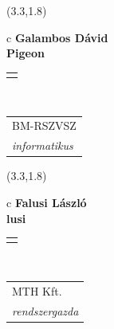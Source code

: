 \documentclass[11pt]{article}
\begin{document}
\makebox(3.3,1.8){
  \renewcommand\arraystretch{1.3}
  \begin{tabular}[c]{c}
    \hspace{8.5mm}
    \LARGE\bf{ Galambos Dávid }\\
    \hspace{8.5mm}
    \Large{ Pigeon }\\
    \renewcommand\arraystretch{3}
    \begin{tabular}[c]{c}
      \centering
      \fontfamily{phv}\selectfont{
        \textbf{
          \textsc{
            \scriptsize{
            \color{Bright}{ Ismerkedő }\color{Dark}{ Webmester }\color{Bright}{ Sminkmester }\color{Dark}{ Programozó }
            }
          }
        }
      }
    \end{tabular}
    \\
    \renewcommand\arraystretch{1}
    \begin{tabular}{p{3.3in}}
      \hspace{.7cm}BM-RSZVSZ\\
      \hspace{.7cm}\emph{ informatikus }\\
    \end{tabular}
  \end{tabular}
}

\makebox(3.3,1.8){
  \renewcommand\arraystretch{1.3}
  \begin{tabular}[c]{c}
    \hspace{8.5mm}
    \LARGE\bf{ Falusi László }\\
    \hspace{8.5mm}
    \Large{ lusi }\\
    \renewcommand\arraystretch{3}
    \begin{tabular}[c]{c}
      \centering
      \fontfamily{phv}\selectfont{
        \textbf{
          \textsc{
            \scriptsize{
            \color{Dark}{ Ismerkedő }\color{Bright}{ Webmester }\color{Bright}{ Sminkmester }\color{Bright}{ Programozó }
            }
          }
        }
      }
    \end{tabular}
    \\
    \renewcommand\arraystretch{1}
    \begin{tabular}{p{3.3in}}
      \hspace{.7cm}MTH Kft.\\
      \hspace{.7cm}\emph{ rendszergazda }\\
    \end{tabular}
  \end{tabular}
}
\end{document}
